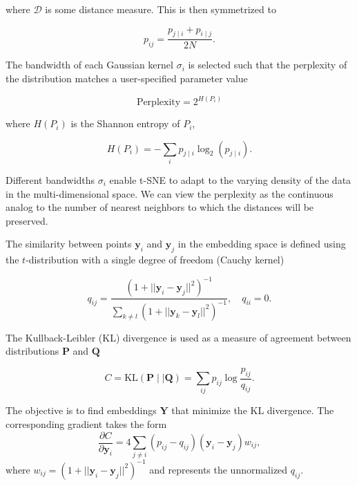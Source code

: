 \documentclass[letter]{article}
\begin{document}
\noindent where $\mathcal{D}$ is some distance measure. This is then
symmetrized to

\begin{equation}
p_{ij} = \frac{p_{j \mid i} + p_{i \mid j}}{2N}.
\label{eq:symmetrize}
\end{equation}

The bandwidth of each Gaussian kernel $\sigma_i$ is selected such that the perplexity of the distribution matches a user-specified parameter value

\begin{equation}
\text{Perplexity} = 2^{H(P_i)}
\end{equation}

\noindent where $H(P_i)$ is the Shannon entropy of $P_i$,

\begin{equation}
H(P_i) = -\sum_i p_{j \mid i} \log_2 (p_{j \mid i}).
\end{equation}

\noindent Different bandwidths $\sigma_i$ enable t-SNE to adapt to the varying density of the data in the multi-dimensional space. We can view the perplexity as the continuous analog to the number of nearest neighbors to which the distances will be preserved. 

The similarity between points $\mathbf{y}_i$ and $\mathbf{y}_j$ in the embedding space is defined using the $t$-distribution with a single degree of freedom (Cauchy kernel)

\begin{equation}
q_{ij} = \frac{\left ( 1 + || \mathbf{y}_i - \mathbf{y}_j ||^2 \right )^{-1}}
{\sum_{k \neq l}\left ( 1 + || \mathbf{y}_k - \mathbf{y}_l ||^2 \right )^{-1}},
\quad q_{ii} = 0.
\label{eq:cauchy_kernel}
\end{equation}

The Kullback-Leibler (KL) divergence is used as a measure of agreement
between distributions $\mathbf{P}$ and $\mathbf{Q}$

\begin{equation}
C = \text{KL}(\mathbf{P} \mid \mid \mathbf{Q}) = \sum_{ij} p_{ij} \log \frac{p_{ij}}{q_{ij}}.
\label{eq:kl_divergence}
\end{equation}

\noindent The objective is to find embeddings $\mathbf{Y}$ that minimize the KL divergence. The corresponding gradient takes the form
\begin{equation}
\frac{\partial C}{\partial \mathbf{y}_i} = 4 \sum_{j \neq i} \left ( p_{ij} - q_{ij} \right ) \left ( \mathbf{y}_i - \mathbf{y}_j \right ) w_{ij},
\label{eq:tsne_gradient}
\end{equation}
where $w_{ij} = \left ( 1 + || \mathbf{y}_i - \mathbf{y}_j || ^2 \right )^{-1}$
and represents the unnormalized $q_{ij}$.
\end{document}
